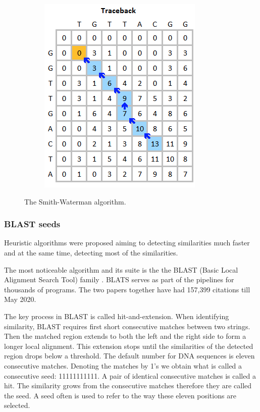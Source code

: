 \begin{figure}[h!]
\begin{subfigure}[b]{0.45\textwidth}
         \includegraphics[width=\textwidth]{img/Smith_waterman_backtra.png}
     \end{subfigure}
        \caption[The Smith-Waterman algorithm.]{The Smith-Waterman algorithm.}
        \label{fig_smith_waterman}
\end{figure}

\subsubsection{BLAST seeds}
Heuristic algorithms were proposed aiming to detecting similarities much faster and at the same time, detecting most of the similarities.

The most noticeable algorithm and its suite is the the BLAST (Basic Local Alignment Search Tool) family \cite{Altschul90_BLAST, altschul1997PSI_BLAST}. BLATS serves as part of the pipelines for thousands of programs. The two papers together have had 157,399 citations till May 2020. 

The key process in BLAST is called hit-and-extension. When identifying similarity, BLAST requires first short consecutive matches between two strings. Then the matched region extends to both the left and the right side to form a longer local alignment. This extension stops until the similarities of the detected region drops below a threshold. The default number for DNA sequences is eleven consecutive matches. Denoting the matches by 1's we obtain what is called a consecutive seed: 11111111111. A pair of identical consecutive matches is called a hit. The similarity grows from the consecutive matches therefore they are called the seed. A seed often is used to refer to the way these eleven positions are selected.

